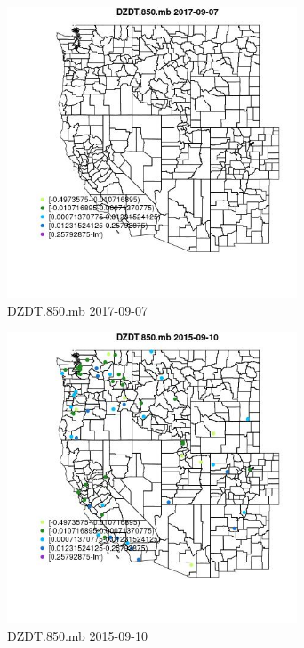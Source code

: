 \begin{figure} 
\centering  
\includegraphics[width=0.77\textwidth]{Code_Outputs/Report_ML_input_PM25_Step4_part_e_de_duplicated_aveswNAs_MapObsDZDT850mb2017-09-07.jpg} 
\caption{\label{fig:Report_ML_input_PM25_Step4_part_e_de_duplicated_aveswNAsMapObsDZDT850mb2017-09-07}DZDT.850.mb 2017-09-07} 
\end{figure} 
 

\begin{figure} 
\centering  
\includegraphics[width=0.77\textwidth]{Code_Outputs/Report_ML_input_PM25_Step4_part_e_de_duplicated_aveswNAs_MapObsDZDT850mb2015-09-10.jpg} 
\caption{\label{fig:Report_ML_input_PM25_Step4_part_e_de_duplicated_aveswNAsMapObsDZDT850mb2015-09-10}DZDT.850.mb 2015-09-10} 
\end{figure} 
 

